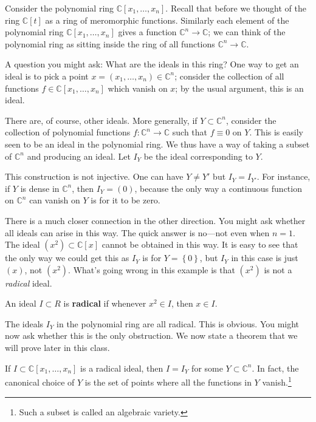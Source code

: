 \begin{example} 
Consider the polynomial ring $\mathbb{C}[x_1, \dots, x_n]$. Recall that before
we thought of the ring $\mathbb{C}[t]$ as a ring of meromorphic functions.  
Similarly each element of the polynomial ring $\mathbb{C}[x_1, \dots, x_n]$
gives a function $\mathbb{C}^n \to \mathbb{C}$; we can think of the polynomial
ring as sitting inside the ring of all functions $\mathbb{C}^n \to \mathbb{C}$.

A question you might ask: What are the ideals in this ring?  One way to get an
ideal is to pick a point $x=(x_1, \dots, x_n) \in \mathbb{C}^n$; consider the
collection of all functions $f \in \mathbb{C}[x_1, \dots, x_n]$ which vanish on
$x$; by the usual argument, this is an ideal.

There are, of course, other ideals. More generally, if $Y \subset
\mathbb{C}^n$, consider the collection of polynomial functions $f:
\mathbb{C}^n \to \mathbb{C}$ such that $f \equiv 0$ on
$Y$.  This is easily seen to be an ideal in the polynomial ring. We thus have a
way of taking a subset of $\mathbb{C}^n$ and producing an ideal.
Let $I_Y$ be the ideal corresponding to $Y$.  

This construction is not injective. One can have $Y \neq Y'$ but $I_Y = I_{Y'}$. For instance, if $Y$ is dense in
$\mathbb{C}^n$, then $I_Y = (0)$, because the only way a continuous function on
$\mathbb{C}^n$ can vanish on $Y$ is for it to be zero.

There is a much closer connection in the other direction. You might ask whether
all ideals can arise in this way. The quick answer is no---not even when $n=1$. The ideal $(x^2) \subset \mathbb{C}[x]$ cannot be obtained
in this way.  It is easy to see that the only way we could get this as $I_Y$ is
for $Y=\left\{0\right\}$, but $I_Y$ in this case is just $(x)$, not $(x^2)$.
What's going wrong in this example is that $(x^2)$ is not a \emph{radical}
ideal.
\end{example} 

\begin{definition}\label{def-radical-ideal} 
An ideal $I \subset R$ is \textbf{radical} if whenever $x^2 \in I$, then $x \in
I$.
\end{definition} 

The ideals $I_Y$ in the polynomial ring are all radical.  This is obvious.
You might now ask whether this is the only obstruction. We now state a theorem
that we will prove later in this class.

\begin{theorem} If $I \subset \mathbb{C}[x_1, \dots,
x_n]$ is a radical ideal, then $I = I_Y$ for some $Y \subset \mathbb{C}^n$. In
fact, the canonical choice of $Y$ is the set of points where all the functions
in $Y$ vanish.\footnote{Such a subset is called an algebraic variety.}
\end{theorem} 


